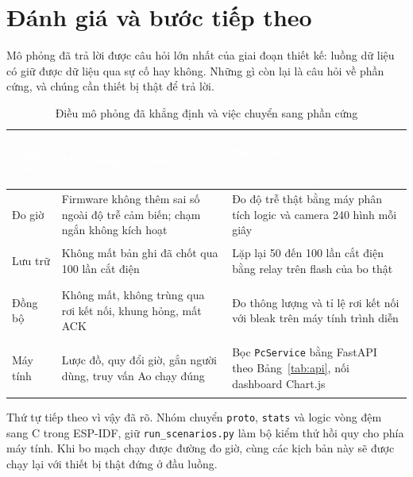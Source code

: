 \section{Đánh giá và bước tiếp theo}
Mô phỏng đã trả lời được câu hỏi lớn nhất của giai đoạn thiết kế: luồng dữ liệu có giữ được dữ liệu qua sự cố hay không. Những gì còn lại là câu hỏi về phần cứng, và chúng cần thiết bị thật để trả lời.

\begin{table}[H]
    \centering
    \small
    \renewcommand{\arraystretch}{1.4}
    \caption{Điều mô phỏng đã khẳng định và việc chuyển sang phần cứng}
    \label{tab:sim-next}
    \begin{tabular}{>{\bfseries\raggedright\arraybackslash}m{3.0cm} >{\raggedright\arraybackslash}m{5.4cm} >{\raggedright\arraybackslash}m{5.8cm}}
        \toprule
        \rowcolor{haitayblue}
        \textcolor{white}{Hạng mục} & \textcolor{white}{Mô phỏng đã khẳng định} & \textcolor{white}{Bước tiếp theo trên thiết bị thật} \\
        \midrule
        \rowcolor{haitayblue!8}
        Đo giờ & Firmware không thêm sai số ngoài độ trễ cảm biến; chạm ngắn không kích hoạt & Đo độ trễ thật bằng máy phân tích logic và camera 240 hình mỗi giây \\
        Lưu trữ & Không mất bản ghi đã chốt qua 100 lần cắt điện & Lặp lại 50 đến 100 lần cắt điện bằng relay trên flash của bo thật \\
        \rowcolor{haitayblue!8}
        Đồng bộ & Không mất, không trùng qua rơi kết nối, khung hỏng, mất ACK & Đo thông lượng và tỉ lệ rơi kết nối với bleak trên máy tính trình diễn \\
        Máy tính & Lược đồ, quy đổi giờ, gắn người dùng, truy vấn Ao chạy đúng & Bọc \texttt{PcService} bằng FastAPI theo Bảng~\ref{tab:api}, nối dashboard Chart.js \\
        \bottomrule
    \end{tabular}
\end{table}

Thứ tự tiếp theo vì vậy đã rõ. Nhóm chuyển \texttt{proto}, \texttt{stats} và logic vòng đệm sang C trong ESP-IDF, giữ \texttt{run\_scenarios.py} làm bộ kiểm thử hồi quy cho phía máy tính. Khi bo mạch chạy được đường đo giờ, cùng các kịch bản này sẽ được chạy lại với thiết bị thật đứng ở đầu luồng.
